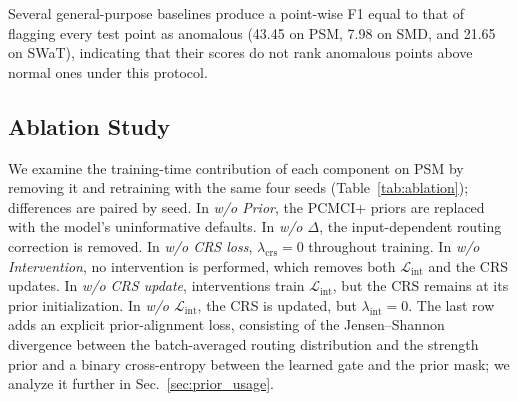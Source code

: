 Several general-purpose baselines produce a point-wise F1 equal to that of
flagging every test point as anomalous (43.45 on PSM, 7.98 on SMD, and 21.65 on
SWaT), indicating that their scores do not rank anomalous points above normal
ones under this protocol.

\subsection{Ablation Study}
\label{sec:ablation}

We examine the training-time contribution of each component on PSM by removing
it and retraining with the same four seeds (Table~\ref{tab:ablation});
differences are paired by seed. In \emph{w/o Prior}, the PCMCI+ priors are
replaced with the model's uninformative defaults. In \emph{w/o \(\Delta\)}, the
input-dependent routing correction is removed. In \emph{w/o CRS loss},
\(\lambda_{\mathrm{crs}}=0\) throughout training. In \emph{w/o Intervention}, no
intervention is performed, which removes both \(\mathcal{L}_{\mathrm{int}}\) and
the CRS updates. In \emph{w/o CRS update}, interventions train
\(\mathcal{L}_{\mathrm{int}}\), but the CRS remains at its prior initialization.
In \emph{w/o \(\mathcal{L}_{\mathrm{int}}\)}, the CRS is updated, but
\(\lambda_{\mathrm{int}}=0\). The last row adds an explicit prior-alignment loss,
consisting of the Jensen--Shannon divergence between the batch-averaged routing
distribution and the strength prior and a binary cross-entropy between the
learned gate and the prior mask; we analyze it further in
Sec.~\ref{sec:prior_usage}.

